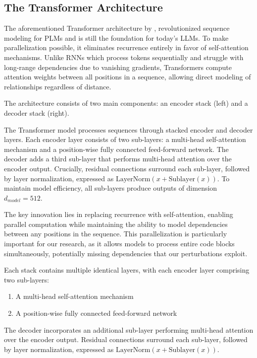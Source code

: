 \documentclass[%
thesis=student,%
coverpage=false,%
titlepage=false,%
headmarks=true, %
english,%
font=libertine, %
math=newpxtx, %
BCOR=5mm,%
coverBCOR=11mm%
]{tum-templates/book/tumbook}
\begin{document}
\subsection{The Transformer Architecture}

The aforementioned Transformer architecture by \textcite{Vaswani2017}, revolutionized sequence modeling for PLMs and is still the foundation for today's LLMs. To make parallelization possible, it eliminates recurrence entirely in favor of self-attention mechanisms. Unlike RNNs which process tokens sequentially and struggle with long-range dependencies due to vanishing gradients, Transformers compute attention weights between all positions in a sequence, allowing direct modeling of relationships regardless of distance.

The architecture consists of two main components: an encoder stack (left) and a decoder stack (right). 

The Transformer model processes sequences through stacked encoder and decoder layers. Each encoder layer consists of two sub-layers: a multi-head self-attention mechanism and a position-wise fully connected feed-forward network. The decoder adds a third sub-layer that performs multi-head attention over the encoder output. Crucially, residual connections surround each sub-layer, followed by layer normalization, expressed as $\text{LayerNorm}(x + \text{Sublayer}(x))$. To maintain model efficiency, all sub-layers produce outputs of dimension $d_{model} = 512$.

The key innovation lies in replacing recurrence with self-attention, enabling parallel computation while maintaining the ability to model dependencies between any positions in the sequence. This parallelization is particularly important for our research, as it allows models to process entire code blocks simultaneously, potentially missing dependencies that our perturbations exploit.

Each stack contains multiple identical layers, with each encoder layer comprising two sub-layers:
\begin{enumerate}
    \item A multi-head self-attention mechanism
    \item A position-wise fully connected feed-forward network
\end{enumerate}

The decoder incorporates an additional sub-layer performing multi-head attention over the encoder output. Residual connections surround each sub-layer, followed by layer normalization, expressed as $\text{LayerNorm}(x + \text{Sublayer}(x))$.
\end{document}
